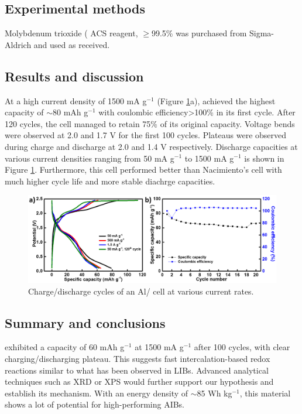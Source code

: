 \subsection{Experimental methods}
Molybdenum trioxide ( ACS reagent, $\geq$99.5\% was purchased from Sigma-Aldrich and used as received.

\subsection{Results and discussion}
At a high current density of 1500 mA g$^{-1}$ (Figure \ref{Figures/chap6fig:MoO3cdcce}a), achieved the highest capacity of $\sim$80 mAh g$^{-1}$ with coulombic efficiency>100\% in its first cycle. After 120 cycles, the cell managed to retain 75\% of its original capacity. Voltage bends were observed at 2.0 and 1.7 V for the first 100 cycles. Plateaus were observed during charge and discharge at 2.0 and 1.4 V respectively. Discharge capacities at various current densities ranging from 50 mA g$^{-1}$ to 1500 mA g$^{-1}$ is shown in Figure \ref{Figures/chap6fig:MoO3cdcce}. Furthermore, this cell performed better than Nacimiento's cell with much higher cycle life and more stable diachrge capacities. 

\begin{figure}[th!]
\centering
\includegraphics[width=\textwidth]{Figures/chap6fig/MoO3cdcce}
\caption{Charge/discharge cycles of an Al/ cell at various current rates.}
\label{Figures/chap6fig:MoO3cdcce}
\end{figure}

\subsection{Summary and conclusions}
 exhibited a capacity of 60 mAh g$^{-1}$ at 1500 mA g$^{-1}$ after 100 cycles, with clear charging/discharging plateau. This suggests fast intercalation-based redox reactions similar to what has been observed in LIBs. Advanced analytical techniques such as XRD or XPS would further support our hypothesis and establish its mechanism. With an energy density of $\sim$85 Wh kg$^{-1}$, this material shows a lot of potential for high-performing AIBs. 


